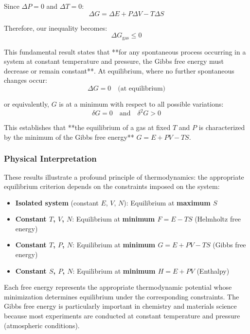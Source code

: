 \documentclass[10pt,twocoloumn]{article}
\begin{document}
Since $\Delta P = 0$ and $\Delta T = 0$:
\begin{equation}\Delta G = \Delta E + P\Delta V - T\Delta S\end{equation}

Therefore, our inequality becomes:
\begin{equation}\boxed{\Delta G_{\text{gas}} \leq 0}\end{equation}

This fundamental result states that **for any spontaneous process occurring in a system at constant temperature and pressure, the Gibbs free energy must decrease or remain constant**. At equilibrium, where no further spontaneous changes occur:
\begin{equation}\Delta G = 0 \quad \text{(at equilibrium)}\end{equation}

or equivalently, $G$ is at a minimum with respect to all possible variations:
\begin{equation}\delta G = 0 \quad \text{and} \quad \delta^2 G > 0\end{equation}

This establishes that **the equilibrium of a gas at fixed $T$ and $P$ is characterized by the minimum of the Gibbs free energy** $G = E + PV - TS$.

\subsubsection*{Physical Interpretation}

These results illustrate a profound principle of thermodynamics: the appropriate equilibrium criterion depends on the constraints imposed on the system:
\begin{itemize}
    \item \textbf{Isolated system} (constant $E$, $V$, $N$): Equilibrium at \textbf{maximum $S$}
    \item \textbf{Constant $T$, $V$, $N$}: Equilibrium at \textbf{minimum $F = E - TS$} (Helmholtz free energy)
\item \textbf{Constant $T$, $P$, $N$}: Equilibrium at \textbf{minimum $G = E + PV - TS$} (Gibbs free energy)
\item \textbf{Constant $S$, $P$, $N$}: Equilibrium at \textbf{minimum $H = E + PV$} (Enthalpy)
\end{itemize}
Each free energy represents the appropriate thermodynamic potential whose minimization determines equilibrium under the corresponding constraints. The Gibbs free energy is particularly important in chemistry and materials science because most experiments are conducted at constant temperature and pressure (atmospheric conditions).
\end{document}
